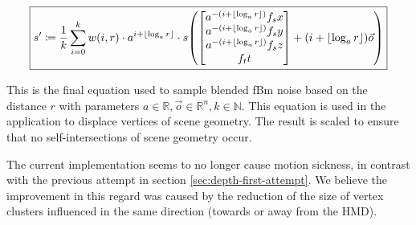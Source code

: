 \begin{equation}\label{eq:fbm5}
    \boxed{
        s' \coloneqq \frac{1}{k} \sum_{i=0}^{k} w(i, r) \cdot a^{i + \lfloor \log_a r \rfloor} \cdot s\mleft(\begin{bmatrix}a^{-(i + \lfloor \log_a r \rfloor)}f_sx\\a^{-(i + \lfloor \log_a r \rfloor)}f_sy\\a^{-(i + \lfloor \log_a r \rfloor)}f_sz\\f_tt\end{bmatrix} + (i + \lfloor \log_a r \rfloor) \vec{o}\mright)
    }
\end{equation}

This is the final equation used to sample blended \ac{fBm} noise based on the distance $r$ with parameters $a \in \mathbb{R}, \vec{o} \in \mathbb{R}^n, k \in \mathbb{N}$. This equation is used in the application to displace vertices of scene geometry. The result is scaled to ensure that no self-intersections of scene geometry occur.

The current implementation seems to no longer cause motion sickness, in contrast with the previous attempt in section \ref{sec:depth-first-attempt}. We believe the improvement in this regard was caused by the reduction of the size of vertex clusters influenced in the same direction (towards or away from the \ac{HMD}).

